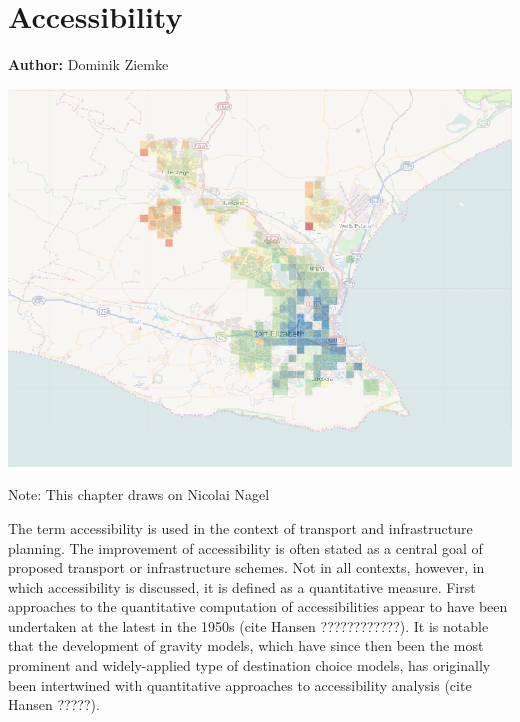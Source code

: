 \chapter{Accessibility }
\label{ch:accessibility}

\hfill \textbf{Author:} Dominik Ziemke

\begin{center} \includegraphics[width=1.\textwidth, angle=0]{extending/figures/accessibility/w_freeSpeed_snapshot.png} \end{center}


Note: This chapter draws on Nicolai Nagel

The term accessibility is used in the context of transport and infrastructure planning. The improvement of accessibility is often stated as a central goal of proposed transport or infrastructure schemes. Not in all contexts, however, in which accessibility is discussed, it is defined as a quantitative measure. First approaches to the quantitative computation of accessibilities appear to have been undertaken at the latest in the 1950s (cite Hansen ????????????). It is notable that the development of gravity models, which have since then been the most prominent and widely-applied type of destination choice models, has originally been intertwined with quantitative approaches to accessibility analysis (cite Hansen ?????).

